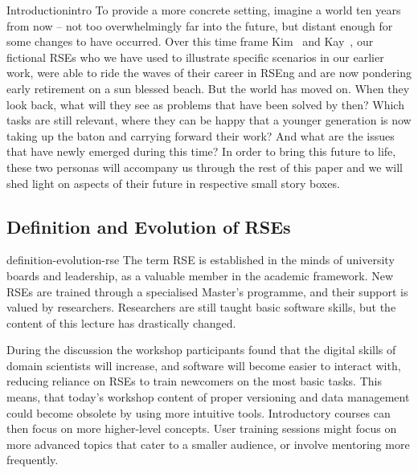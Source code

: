 \documentclass{eceasst}
\begin{document}
\begin{story}{Introduction}{intro}
To provide a more concrete setting, imagine a world ten years from now --
not too overwhelmingly far into the future, but distant enough for some changes to have occurred.
Over this time frame Kim~\cite{Anzt2021} and Kay~\cite{Goth2024},
our fictional RSEs who we have used to illustrate specific scenarios in our earlier work,
were able to ride the waves of their career in RSEng and are now pondering early retirement on a sun blessed beach.
But the world has moved on.
When they look back, what will they see as problems that have been solved by then?
Which tasks are still relevant, where they can be happy that a younger generation is now taking up the baton and carrying forward their work?
And what are the issues that have newly emerged during this time?
In order to bring this future to life, these two personas will accompany us through the rest of this paper and we will shed light on aspects
of their future in respective small story boxes.
\end{story}

\subsection{Definition and Evolution of RSEs}
\begin{whatis}{}{definition-evolution-rse}
The term RSE is established in the minds of university boards and leadership, as a valuable member in the academic framework.
New RSEs are trained through a specialised Master's programme, and their support is valued by researchers.
Researchers are still taught basic software skills, but the content of this lecture has drastically changed.
\end{whatis}
During the discussion the workshop participants found that
the digital skills of domain scientists will increase,
and software will become easier to interact with,
reducing reliance on RSEs to train newcomers on the most basic tasks.
This means, that today's workshop content of proper versioning
and data management could become obsolete by using more intuitive tools.
Introductory courses can then focus on more higher-level concepts.
User training sessions might focus on more advanced topics
that cater to a smaller audience, or involve mentoring more frequently.
\end{document}
